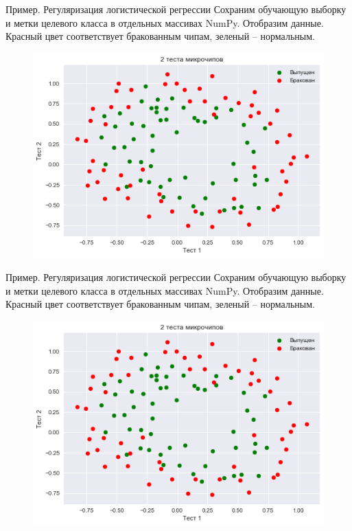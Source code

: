 \documentclass{beamer}
\begin{document}
\begin{frame}[fragile]{Пример. Регуляризация логистической регрессии}
Сохраним обучающую выборку и метки целевого класса в отдельных массивах NumPy. Отобразим данные. Красный цвет соответствует бракованным чипам, зеленый – нормальным.
\begin{figure}[h]
\centering
\includegraphics[scale=0.5]{images/test-03.png}
\end{figure}
\end{frame}

\begin{frame}[fragile]{Пример. Регуляризация логистической регрессии}
Сохраним обучающую выборку и метки целевого класса в отдельных массивах NumPy. Отобразим данные. Красный цвет соответствует бракованным чипам, зеленый – нормальным.
\begin{figure}[h]
\centering
\includegraphics[scale=0.4]{images/test-03.png}
\end{figure}
\end{frame}
\end{document}
